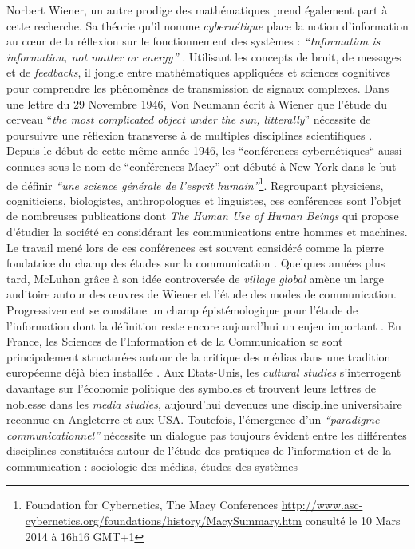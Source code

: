 Norbert Wiener, un autre prodige des mathématiques prend également part à cette recherche. Sa théorie qu{\textquoteright}il nomme \textit{cybernétique }place la notion d{\textquoteright}information au c{\oe}ur de la réflexion sur le fonctionnement des systèmes : \textit{{\textquotedblleft}Information is information, not matter or energy{\textquotedblright}} \citep[p. 155]{Wiener1948}. Utilisant les concepts de bruit, de messages et de \textit{feedbacks}, il jongle entre mathématiques appliquées et sciences cognitives pour comprendre les phénomènes de transmission de signaux complexes. Dans une lettre du 29 Novembre 1946, Von Neumann écrit à Wiener que l{\textquoteright}étude du cerveau {\textquotedblleft}\textit{the most complicated object under the sun, litterally}{\textquotedblright} nécessite de poursuivre une réflexion transverse à de multiples disciplines scientifiques \citep{Masani1990}. Depuis le début de cette m\^eme année 1946, les {\textquotedblleft}conférences cybernétiques{\textquotedblleft} aussi connues sous le nom de {\textquotedblleft}conférences Macy{\textquotedblright} ont débuté à New York dans le but de définir \textit{{\textquotedblleft}une science générale de l{\textquoteright}esprit humain{\textquotedblright}}\footnote{ Foundation for Cybernetics, The Macy Conferences \url{http://www.asc-cybernetics.org/foundations/history/MacySummary.htm} consulté le 10 Mars 2014 à 16h16 GMT+1}. Regroupant physiciens, cogniticiens, biologistes, anthropologues et linguistes, ces conférences sont l{\textquoteright}objet de nombreuses publications dont \textit{The Human Use of Human Beings} \citep{Wiener1988} qui propose d{\textquoteright}étudier la société en considérant les communications entre hommes et machines. Le travail mené lors de ces conférences est souvent considéré comme la pierre fondatrice du champ des études sur la communication \citep{Breton1997, Winkin1981}. Quelques années plus tard, McLuhan grâce à son idée controversée de \textit{village global} \citep{McLuhan1962} amène un large auditoire autour des {\oe}uvres de Wiener et l{\textquoteright}étude des modes de communication. Progressivement se constitue un champ épistémologique pour l{\textquoteright}étude de l{\textquoteright}information dont la définition reste encore aujourd{\textquoteright}hui un enjeu important \citep{Wolton1997}. En France, les Sciences de l{\textquoteright}Information et de la Communication se sont principalement structurées autour de la critique des médias \citep{Mattelart1986, Debray1991} dans une tradition européenne déjà bien installée \citep{Adorno2005}. Aux Etats-Unis, les \textit{cultural studies }\citep{Hall2003} s{\textquoteright}interrogent davantage sur l{\textquoteright}économie politique des symboles et trouvent leurs lettres de noblesse dans les \textit{media studies}, aujourd{\textquoteright}hui devenues une discipline universitaire reconnue en Angleterre et aux USA. Toutefois, l{\textquoteright}émergence d{\textquoteright}un \textit{{\textquotedblleft}paradigme communicationnel{\textquotedblright} }\citep{Bougnoux1993} nécessite un dialogue pas toujours évident entre les différentes disciplines constituées autour de l{\textquoteright}étude des pratiques de l{\textquoteright}information et de la communication : sociologie des médias, études des systèmes 